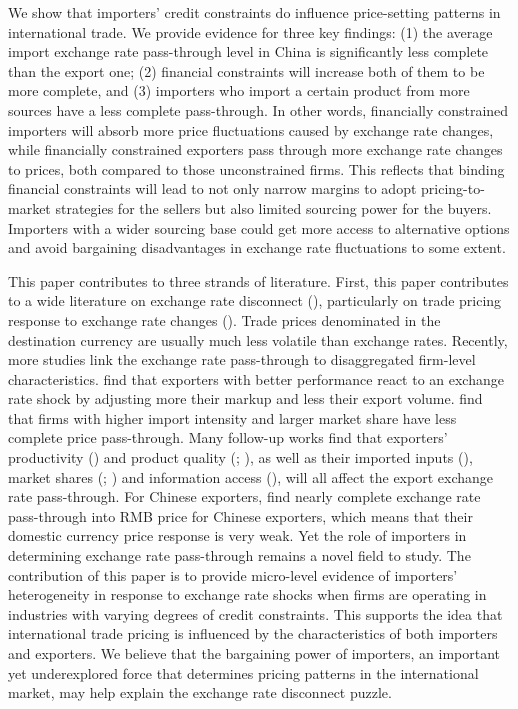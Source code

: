 \documentclass[12pt]{article}
\begin{document}
We show that importers' credit constraints do influence price-setting patterns in international trade. We provide evidence for three key findings: (1) the average import exchange rate pass-through level in China is significantly less complete than the export one; (2) financial constraints will increase both of them to be more complete, and (3) importers who import a certain product from more sources have a less complete pass-through. In other words, financially constrained importers will absorb more price fluctuations caused by exchange rate changes, while financially constrained exporters pass through more exchange rate changes to prices, both compared to those unconstrained firms. This reflects that binding financial constraints will lead to not only narrow margins to adopt pricing-to-market strategies for the sellers but also limited sourcing power for the buyers. Importers with a wider sourcing base could get more access to alternative options and avoid bargaining disadvantages in exchange rate fluctuations to some extent.

This paper contributes to three strands of literature. First, this paper contributes to a wide literature on exchange rate disconnect (\cite{obstfeld2000}), particularly on trade pricing response to exchange rate changes (\cite{campa2005}). Trade prices denominated in the destination currency are usually much less volatile than exchange rates. Recently, more studies link the exchange rate pass-through to disaggregated firm-level characteristics. \cite{bmm2012} find that exporters with better performance react to an exchange rate shock by adjusting more their markup and less their export volume. \cite{aik2014} find that firms with higher import intensity and larger market share have less complete price pass-through. Many follow-up works find that exporters' productivity (\cite{lmx2015}) and product quality (\cite{chen2016}; \cite{auer2018}), as well as their imported inputs (\cite{wang-yu2021}), market shares (\cite{auer2016}; \cite{devereux2017}) and information access (\cite{garetto2016}), will all affect the export exchange rate pass-through. For Chinese exporters, \cite{lmx2015} find nearly complete exchange rate pass-through into RMB price for Chinese exporters, which means that their domestic currency price response is very weak. Yet the role of importers in determining exchange rate pass-through remains a novel field to study. The contribution of this paper is to provide micro-level evidence of importers' heterogeneity in response to exchange rate shocks when firms are operating in industries with varying degrees of credit constraints. This supports the idea that international trade pricing is influenced by the characteristics of both importers and exporters. We believe that the bargaining power of importers, an important yet underexplored force that determines pricing patterns in the international market, may help explain the exchange rate disconnect puzzle. 
\end{document}
